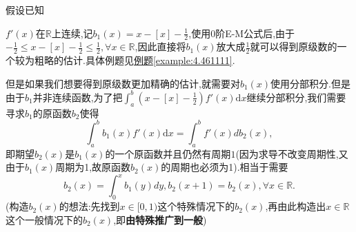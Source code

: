 \documentclass[../../main.tex]{subfiles}
\begin{document}
\begin{remark}
\hypertarget{remark:利用0阶E-M公式精细估阶的构造}{假设已知}$f'(x)$在$\mathbb{R}$上连续,记\(b_1(x)=x - [x]-\frac{1}{2}\),使用0阶E-M公式后,由于$-\frac{1}{2}\leqslant x-[x]-\frac{1}{2}\leqslant \frac{1}{2},\forall x\in \mathbb{R}$,因此直接将$b_1(x)$放大成$\frac{1}{2}$就可以得到原级数的一个较为粗略的估计.具体例题见\hyperref[example:4.461111]{例题\ref{example:4.461111}}.

但是如果我们想要得到原级数更加精确的估计,就需要对$b_1(x)$使用分部积分.但是由于\(b_1\)并非连续函数,为了把\(\int_{a}^{b}(x - [x]-\frac{1}{2})f'(x)\mathrm{d}x\)继续分部积分,我们需要寻求\(b_1\)的原函数\(b_2\)使得
\[
\int_{a}^{b}b_1(x)f'(x)\mathrm{d}x=\int_{a}^{b}f'(x)db_2(x),
\]
即期望\(b_2(x)\)是$b_1(x)$的一个原函数并且仍然有周期\(1\)(因为求导不改变周期性,又由于$b_1(x)$周期为1,故原函数$b_2(x)$的周期也必须为1).相当于需要
\[
b_2(x)=\int_0^x{b_1(y)dy},b_2(x+1)=b_2(x),\forall x\in \mathbb{R} .
\]
(构造$b_2(x)$的想法:先找到$x\in [0,1)$这个特殊情况下的$b_2(x)$,再由此构造出$x\in \mathbb{R}$这个一般情况下的$b_2(x)$,即\textbf{由特殊推广到一般})


\end{remark}
\end{document}
